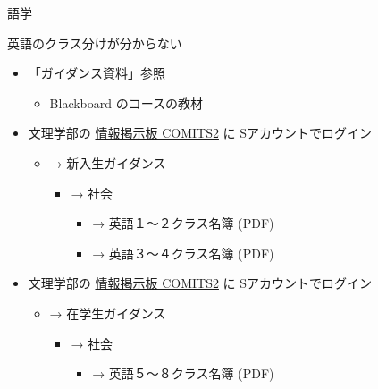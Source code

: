 \documentclass[a4j,10pt]{jsarticle}
\def\lthtmlcheckvsize{\ifdim\ht\sizebox<\vsize 
  \ifdim\wd\sizebox<\hsize\expandafter\hfill\fi \expandafter\vfill
  \else\expandafter\vss\fi}%
\begin{document}
{\begin{frame}[label={sec:org4d469f0},fragile]{語学}
\par
\begin{block}{英語のクラス分けが分からない}
\begin{itemize}
\item 「ガイダンス資料」参照
\begin{itemize}
\item Blackboard のコースの教材
\end{itemize}
\par
\item 文理学部の \href{https://comits2.educ.chs.nihon-u.ac.jp/uniprove\_pt/UnLoginAction}{情報掲示板 COMITS2} に Sアカウントでログイン
\begin{itemize}
\item → 新入生ガイダンス
\begin{itemize}
\item → 社会
\begin{itemize}
\item → 英語１～２クラス名簿 (PDF)
\item → 英語３～４クラス名簿 (PDF)
\end{itemize}
\end{itemize}
\end{itemize}
\par
\item 文理学部の \href{https://comits2.educ.chs.nihon-u.ac.jp/uniprove\_pt/UnLoginAction}{情報掲示板 COMITS2} に Sアカウントでログイン
\begin{itemize}
\item → 在学生ガイダンス
\begin{itemize}
\item → 社会
\begin{itemize}
\item → 英語５～８クラス名簿 (PDF)
\end{itemize}
\end{itemize}
\end{itemize}
\end{itemize}
\end{block}
\end{frame}%
\lthtmlfigureZ
\lthtmlcheckvsize\clearpage}
\end{document}

